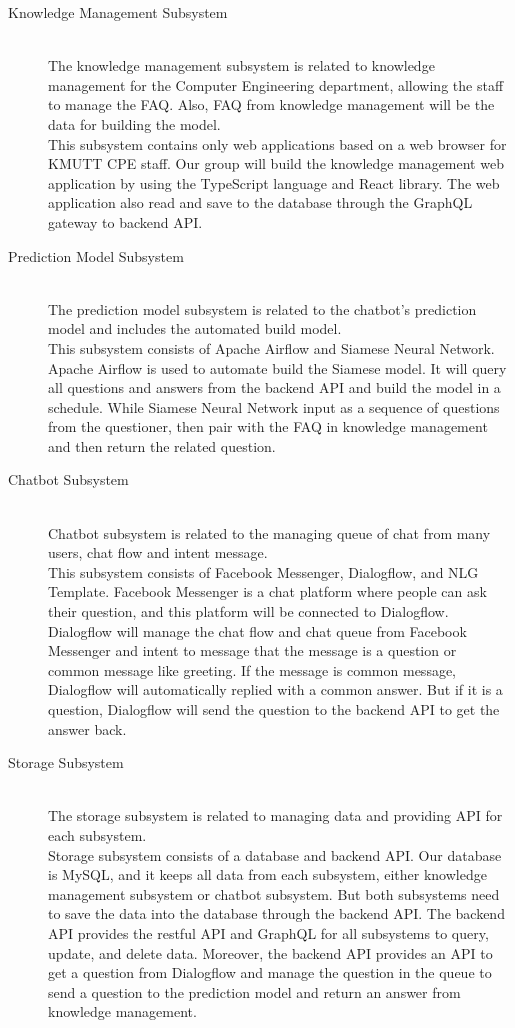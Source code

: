 \documentclass[12pt,oneside,openright,a4paper]{cpe-english-project}
\begin{document}
\begin{description}
	\item [Knowledge Management Subsystem]
	\hfill \\The knowledge management subsystem is related to knowledge management for the Computer Engineering department, allowing the staff to manage the FAQ. Also, FAQ from knowledge management will be the data for building the model.\\
	This subsystem contains only web applications based on a web browser for KMUTT CPE staff. Our group will build the knowledge management web application by using the TypeScript language and React library. The web application also read and save to the database through the GraphQL gateway to backend API.
	\item [Prediction Model Subsystem]
	\hfill \\The prediction model subsystem is related to the chatbot's prediction model and includes the automated build model.\\
	This subsystem consists of Apache Airflow and Siamese Neural Network. Apache Airflow is used to automate build the Siamese model. It will query all questions and answers from the backend API and build the model in a schedule. While Siamese Neural Network input as a sequence of questions from the questioner, then pair with the FAQ in knowledge management and then return the related question.
	\item [Chatbot Subsystem]
	\hfill \\Chatbot subsystem is related to the managing queue of chat from many users, chat flow and intent message.\\
	This subsystem consists of Facebook Messenger, Dialogflow, and NLG Template. Facebook Messenger is a chat platform where people can ask their question, and this platform will be connected to Dialogflow. Dialogflow will manage the chat flow and chat queue from Facebook Messenger and intent to message that the message is a question or common message like greeting. If the message is common message, Dialogflow will automatically replied with a common answer. But if it is a question, Dialogflow will send the question to the backend API to get the answer back.
	\item [Storage Subsystem]
	\hfill \\The storage subsystem is related to managing data and providing API for each subsystem.\\
	Storage subsystem consists of a database and backend API. Our database is MySQL, and it keeps all data from each subsystem, either knowledge management subsystem or chatbot subsystem. But both subsystems need to save the data into the database through the backend API. The backend API provides the restful API and GraphQL for all subsystems to query, update, and delete data. Moreover, the backend API provides an API to get a question from Dialogflow and manage the question in the queue to send a question to the prediction model and return an answer from knowledge management.
\end{description}
\end{document}
